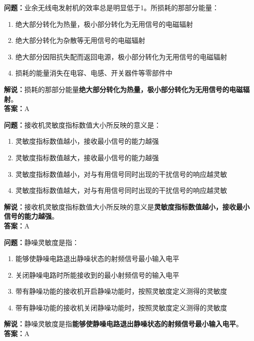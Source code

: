 \textbf{问题：}业余无线电发射机的效率总是明显低于1。所损耗的那部分能量：

\begin{enumerate}[label=\Alph*), leftmargin=1.5cm]
	\item 绝大部分转化为热量，极小部分转化为无用信号的电磁辐射
	\item 绝大部分转化为杂散等无用信号的电磁辐射
	\item 绝大部分因阻抗失配而返回电源，极小部分转化为无用信号的电磁辐射
	\item 损耗的能量消失在电容、电感、开关器件等零部件中
\end{enumerate}

\textbf{解说：}损耗的那部分能量\textbf{绝大部分转化为热量，极小部分转化为无用信号的电磁辐射}。\\\textbf{答案：}A%



\textbf{问题：}接收机灵敏度指标数值大小所反映的意义是：

\begin{enumerate}[label=\Alph*), leftmargin=1.5cm]
	\item 灵敏度指标数值越小，接收最小信号的能力越强
	\item 灵敏度指标数值越大，接收最小信号的能力越强
	\item 灵敏度指标数值越小，对与有用信号同时出现的干扰信号的响应越灵敏
	\item 灵敏度指标数值越大，对与有用信号同时出现的干扰信号的响应越灵敏
\end{enumerate}

\textbf{解说：}接收机灵敏度指标数值大小所反映的意义是\textbf{灵敏度指标数值越小，接收最小信号的能力越强}。\\\textbf{答案：}A%



\textbf{问题：}静噪灵敏度是指：

\begin{enumerate}[label=\Alph*), leftmargin=1.5cm]
	\item 能够使静噪电路退出静噪状态的射频信号最小输入电平
	\item 关闭静噪电路时所能接收到的最小射频信号的输入电平
	\item 带有静噪功能的接收机开启静噪功能时，按照灵敏度定义测得的灵敏度
	\item 带有静噪功能的接收机关闭静噪功能时，按照灵敏度定义测得的灵敏度
\end{enumerate}

\textbf{解说：}静噪灵敏度是指\textbf{能够使静噪电路退出静噪状态的射频信号最小输入电平}。\\\textbf{答案：}A%



